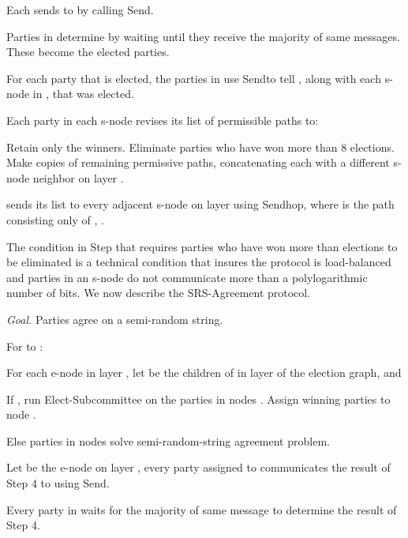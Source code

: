 \documentclass[11pt,letter]{article}
\theoremstyle{mytheoremstyle}
\let\savedCaption=\caption
\renewcommand*{\caption}[1]{\savedCaption[#1]{~#1}}
\newcommand{\algfont}{}
\newcommand{\Sendhop}{\textsf{Sendhop}}
\newcommand{\Send}{\textsf{Send}}
\newenvironment{indentpar}[1]{\begin{list}{}{\setlength{\leftmargin}{#1}}\item[]}
{\end{list}}
\newcommand{\rs}{semi-random-string agreement\xspace}
\newcommand{\es}{\mbox{\textsf{Elect-Subcommittee}}\xspace}
\newcommand{\rsAlg}{\mbox{\textsf{SRS-Agreement}}\xspace}
\begin{document}
\begin{description}
{\begin{algorithm}
\begin{enumerate}
		\item
		\begin{indentpar}{0.5cm}
			Each  sends  to  by calling \Send.
		\end{indentpar}
		\item
		\begin{indentpar}{0.5cm}
			Parties in  determine  by waiting until they receive the majority of same messages. These become the elected parties.
		\end{indentpar}
		\item For each party  that is elected, the parties in  use  \Send to tell , along with each \textsf{s-node} in , that  was elected.
		\item Each party in each \textsf{s-node} revises its list of permissible paths to:
		\begin{indentpar}{0.5cm}
			Retain only the winners.
			Eliminate parties who have won more than 8 elections.
			Make  copies of remaining permissive paths, concatenating each with a different \textsf{s-node} neighbor on layer .
		\end{indentpar}
		\item  sends its list to every adjacent \textsf{s-node}  on layer  using \Sendhop, where  is the path consisting only of , .
	\end{enumerate}
\end{algorithm}

The condition in Step  that requires parties who have won more than  elections to be eliminated is a technical condition that insures the protocol is load-balanced and parties in an \textsf{s-node} do not communicate more than a polylogarithmic number of bits. We now describe the \rsAlg protocol.
\begin{algorithm}
	\caption{{\sf Scalable-}\rsAlg}
		\medskip
		\algfont
		\textit{Goal.} Parties agree on a semi-random string.
	\begin{enumerate}
		\item For  to :
		\item
		\begin{indentpar}{0.3cm}
			For each \textsf{e-node}  in layer , let  be the children of  in layer  of the election graph, and
		\end{indentpar}
		\item
		\begin{indentpar}{0.6cm}
			If , run \es on the parties in nodes . Assign winning parties to node .
		\end{indentpar}
		\item
		\begin{indentpar}{0.6cm}
			Else parties in nodes  solve \rs problem.
		\end{indentpar}
		\item Let  be the \textsf{e-node} on layer , every party  assigned to  communicates the result of Step 4 to  using \Send.
		\item Every party in  waits for the majority of same message to determine the result of Step 4.
	\end{enumerate}
\end{algorithm}

}
\end{description}
\end{document}
